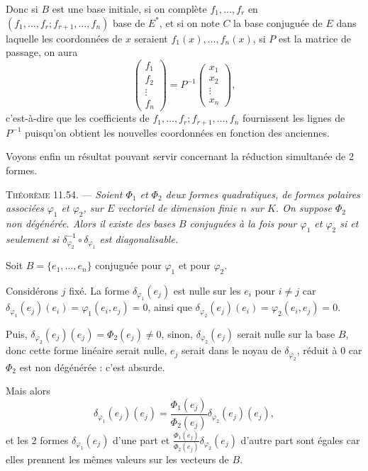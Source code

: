 Donc si $B$ est une base initiale, si on complète $f_1,\ldots,f_r$ en $(f_1,\ldots,f_r;f_{r+1},\ldots,f_n)$ base de $E^*$, et si on note $C$ la base conjuguée de $E$ dans laquelle les coordonnées de $x$ seraient $f_1(x),\ldots,f_n(x)$, si $P$ est la matrice de passage, on aura
\[
\begin{pmatrix}f_1\\f_2\\\vdots\\f_n\end{pmatrix}
=P^{-1}
\begin{pmatrix}x_1\\x_2\\\vdots\\x_n\end{pmatrix},
\]
c'est-à-dire que les coefficients de $f_1,\ldots,f_r;f_{r+1},\ldots,f_n$ fournissent les lignes de $P^{-1}$ puisqu'on obtient les nouvelles coordonnées en fonction des anciennes.

Voyons enfin un résultat pouvant servir concernant la réduction simultanée de 2 formes.

\medskip\noindent\textsc{Théorème 11.54.} --- \emph{Soient $\Phi_1$ et $\Phi_2$ deux formes quadratiques, de formes polaires associées $\varphi_1$ et $\varphi_2$, sur $E$ vectoriel de dimension finie $n$ sur $K$. On suppose $\Phi_2$ non dégénérée. Alors il existe des bases $B$ conjuguées à la fois pour $\varphi_1$ et $\varphi_2$ si et seulement si $\delta_{\varphi_2}^{-1}\circ\delta_{\varphi_1}$ est diagonalisable.}

Soit $B=\{e_1,\ldots,e_n\}$ conjuguée pour $\varphi_1$ et pour $\varphi_2$.

Considérons $j$ fixé. La forme $\delta_{\varphi_1}(e_j)$ est nulle sur les $e_i$ pour $i\ne j$ car $\delta_{\varphi_1}(e_j)(e_i)=\varphi_1(e_i,e_j)=0$, ainsi que $\delta_{\varphi_2}(e_j)(e_i)=\varphi_2(e_i,e_j)=0$.

Puis, $\delta_{\varphi_2}(e_j)(e_j)=\Phi_2(e_j)\ne0$, sinon, $\delta_{\varphi_2}(e_j)$ serait nulle sur la base $B$, donc cette forme linéaire serait nulle, $e_j$ serait dans le noyau de $\delta_{\varphi_2}$, réduit à 0 car $\Phi_2$ est non dégénérée : c'est absurde.

Mais alors
\[
\delta_{\varphi_1}(e_j)(e_j)
=\frac{\Phi_1(e_j)}{\Phi_2(e_j)}\delta_{\varphi_2}(e_j)(e_j),
\]
et les 2 formes $\delta_{\varphi_1}(e_j)$ d'une part et $\frac{\Phi_1(e_j)}{\Phi_2(e_j)}\delta_{\varphi_2}(e_j)$ d'autre part sont égales car elles prennent les mêmes valeurs sur les vecteurs de $B$.

